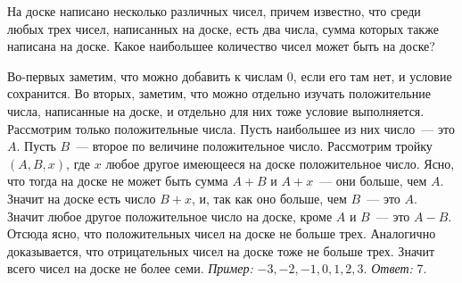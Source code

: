 На доске написано несколько различных чисел, причем известно, что среди любых
трех чисел, написанных на доске, есть два числа, сумма которых также написана
на доске.
Какое наибольшее количество чисел может быть на доске?

\solution
Во-первых заметим, что можно добавить к числам 0, если его там нет,
и условие сохранится.
Во вторых, заметим, что можно отдельно изучать положительние числа,
написанные на доске, и отдельно для них тоже условие выполняется.
Рассмотрим только положительные числа.
Пусть наибольшее из них число~--- это $A$.
Пусть $B$~--- второе по величине положительное число.
Рассмотрим тройку $(A, B, x)$, где $x$ любое другое имеющееся на доске
положительное число.
Ясно, что тогда на доске не может быть сумма $A + B$ и $A + x$~--- они больше,
чем $A$.
Значит на доске есть число $B + x$, и, так как оно больше, чем $B$~--- это $A$.
Значит любое другое положительное число на доске, кроме $A$ и $B$~---
это $A - B$.
Отсюда ясно, что положительных чисел на доске не больше трех.
Аналогично доказывается, что отрицательных чисел на доске тоже не больше трех.
Значит всего чисел на доске не более семи.
\emph{Пример:} $-3, -2, -1, 0, 1, 2, 3$.
\emph{Ответ:} 7.

